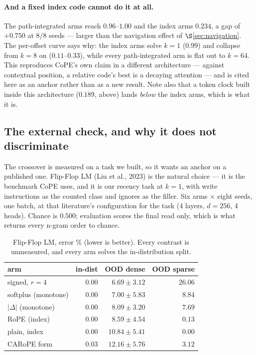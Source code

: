\documentclass[11pt]{article}
\begin{document}
\paragraph{And a fixed index code cannot do it at all.} The path-integrated arms
reach $0.96$--$1.00$ and the index arms $0.234$, a gap of $+0.750$ at $8/8$ seeds
--- larger than the navigation effect of $\S$\ref{sec:navigation}. The per-offset
curve says why: the index arms solve $k=1$ ($0.99$) and collapse from $k=8$ on
($0.11$--$0.33$), while every path-integrated arm is flat out to $k=64$. This
reproduces CoPE's own claim in a different architecture --- against contextual
position, a relative code's best is a decaying attention --- and is cited here as
an anchor rather than as a new result. Note also that a token clock built inside
this architecture ($0.189$, above) lands \emph{below} the index arms, which is
what it is.

\subsection{The external check, and why it does not discriminate}
\label{sec:flipflop}

The crossover is measured on a task we built, so it wants an anchor on a published
one. Flip-Flop LM (Liu et al., 2023) is the natural choice --- it is the benchmark
CoPE uses, and it is our recency task at $k=1$, with write instructions as the
counted class and ignores as the filler. Six arms $\times$ eight seeds, one batch, at
that literature's configuration for the task (4 layers, $d=256$, 4 heads). Chance is
$0.500$; evaluation scores the final read only, which is what returns every n-gram
order to chance.

\begin{table}[htbp]\centering\small
\caption{Flip-Flop LM, error \% (lower is better). Every contrast is unmeasured, and every arm solves the in-distribution split.}
\label{tab:flipflop}
\begin{tabular}{lrrr}
\toprule
arm & in-dist & OOD dense & OOD sparse \\
\midrule
signed, $r{=}4$ & $0.00$ & $6.69 \pm 3.12$ & $26.06$ \\
softplus (monotone) & $0.00$ & $7.00 \pm 5.83$ & $8.84$ \\
$|\Delta|$ (monotone) & $0.00$ & $8.09 \pm 3.20$ & $7.69$ \\
RoPE (index) & $0.00$ & $8.59 \pm 4.54$ & $0.13$ \\
plain, index & $0.00$ & $10.84 \pm 5.41$ & $0.00$ \\
CARoPE form & $0.03$ & $12.16 \pm 5.76$ & $3.12$ \\
\bottomrule
\end{tabular}
\end{table}
\end{document}
